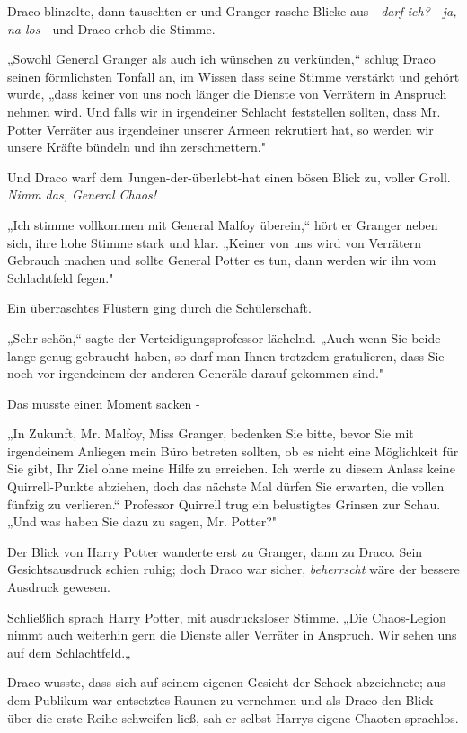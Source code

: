 {Draco blinzelte, dann tauschten er und Granger rasche Blicke aus - \emph{darf ich?} - \emph{ja,} \emph{na los} - und Draco erhob die Stimme.

„Sowohl General Granger als auch ich wünschen zu verkünden,“ schlug Draco seinen förmlichsten Tonfall an, im Wissen dass seine Stimme verstärkt und gehört wurde, „dass keiner von uns noch länger die Dienste von Verrätern in Anspruch nehmen wird. Und falls wir in irgendeiner Schlacht feststellen sollten, dass Mr. Potter Verräter aus irgendeiner unserer Armeen rekrutiert hat, so werden wir unsere Kräfte bündeln und ihn zerschmettern."

Und Draco warf dem Jungen-der-überlebt-hat einen bösen Blick zu, voller Groll. \emph{Nimm das, General Chaos!}

„Ich stimme vollkommen mit General Malfoy überein,“ hört er Granger neben sich, ihre hohe Stimme stark und klar. „Keiner von uns wird von Verrätern Gebrauch machen und sollte General Potter es tun, dann werden wir ihn vom Schlachtfeld fegen."

Ein überraschtes Flüstern ging durch die Schülerschaft.

„Sehr schön,“ sagte der Verteidigungsprofessor lächelnd. „Auch wenn Sie beide lange genug gebraucht haben, so darf man Ihnen trotzdem gratulieren, dass Sie noch vor irgendeinem der anderen Generäle darauf gekommen sind."

Das musste einen Moment sacken -

„In Zukunft, Mr. Malfoy, Miss Granger, bedenken Sie bitte, bevor Sie mit irgendeinem Anliegen mein Büro betreten sollten, ob es nicht eine Möglichkeit für Sie gibt, Ihr Ziel ohne meine Hilfe zu erreichen. Ich werde zu diesem Anlass keine Quirrell-Punkte abziehen, doch das nächste Mal dürfen Sie erwarten, die vollen fünfzig zu verlieren.“ Professor Quirrell trug ein belustigtes Grinsen zur Schau. „Und was haben Sie dazu zu sagen, Mr. Potter?"

Der Blick von Harry Potter wanderte erst zu Granger, dann zu Draco. Sein Gesichtsausdruck schien ruhig; doch Draco war sicher, \emph{beherrscht} wäre der bessere Ausdruck gewesen.

Schließlich sprach Harry Potter, mit ausdrucksloser Stimme. „Die Chaos-Legion nimmt auch weiterhin gern die Dienste aller Verräter in Anspruch. Wir sehen uns auf dem Schlachtfeld.„

Draco wusste, dass sich auf seinem eigenen Gesicht der Schock abzeichnete; aus dem Publikum war entsetztes Raunen zu vernehmen und als Draco den Blick über die erste Reihe schweifen ließ, sah er selbst Harrys eigene Chaoten sprachlos.

}
